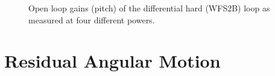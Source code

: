 \begin{figure}
\begin{centering}
\caption{Open loop gains (pitch) of the differential hard (WFS2B) loop as measured at four
  different powers.}
\label{fig:DHolgs}
\end{centering}
\end{figure}




\section{Residual Angular Motion}

